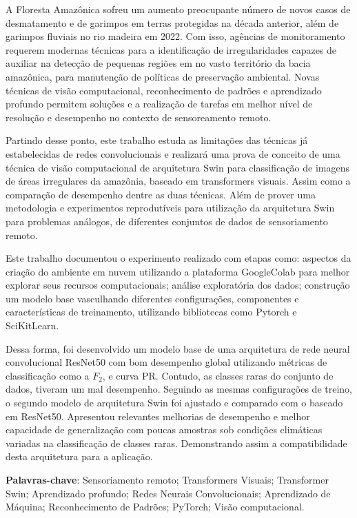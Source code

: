 
\begin{resumo}
  

  A Floresta Amazônica sofreu um aumento preocupante número de novos casos de desmatamento e de garimpos em terras protegidas na década anterior, além de garimpos fluviais no rio madeira em 2022. Com isso, agências de monitoramento requerem modernas técnicas para a identificação de irregularidades capazes de auxiliar na detecção de pequenas regiões em no vasto território da bacia amazônica, para manutenção de políticas de preservação ambiental. Novas técnicas de visão computacional, reconhecimento de padrões e aprendizado profundo permitem soluções e a realização de tarefas em  melhor nível de resolução e desempenho no contexto de sensoreamento remoto.
  
  Partindo desse ponto, este trabalho estuda as limitações das técnicas já estabelecidas de redes convolucionais e realizará uma prova de conceito de uma técnica de visão computacional de arquitetura Swin para classificação de imagens de áreas irregulares da amazônia, baseado em transformers visuais. Assim como a comparação de desempenho dentre as duas técnicas. Além de prover uma metodologia e experimentos reprodutíveis para utilização da arquitetura Swin para problemas análogos, de diferentes conjuntos de dados de sensoriamento remoto.
    
  Este trabalho documentou o experimento realizado com etapas como: aspectos da criação do ambiente em nuvem utilizando a plataforma GoogleColab para melhor explorar seus recursos computacionais; análise exploratória dos dados; construção um modelo base vasculhando diferentes configurações, componentes e características de treinamento, utilizando bibliotecas como Pytorch e SciKitLearn.
  
  Dessa forma, foi desenvolvido um modelo base de uma arquitetura de rede neural convolucional ResNet50 com bom desempenho global utilizando métricas de classificação como a $F_2$, e curva PR. Contudo, as classes raras do conjunto de dados, tiveram um mal desempenho. Seguindo as mesmas configurações de treino, o segundo modelo de arquitetura Swin foi ajustado e comparado com o baseado em ResNet50. Apresentou relevantes melhorias de desempenho e melhor capacidade de generalização com poucas amostras sob condições climáticas variadas na classificação de classes raras. Demonstrando assim a  compatibilidade desta arquitetura para a aplicação.

  
\vspace{\onelineskip}

\noindent 

\textbf{Palavras-chave}: Sensoriamento remoto; Transformers Visuais; Transformer Swin; Aprendizado profundo; Redes Neurais Convolucionais; Aprendizado de Máquina; Reconhecimento de Padrões; PyTorch; Visão computacional.
\end{resumo}